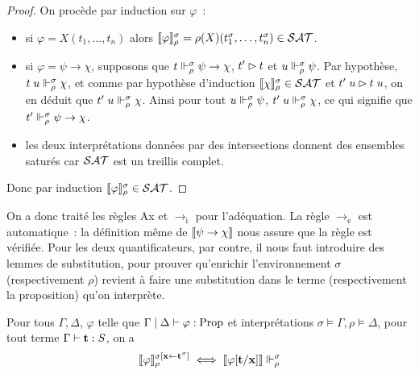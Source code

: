 \documentclass{article}
\begin{document}
\begin{proof}
  On procède par induction sur $\varphi$~:
  \begin{itemize}
  \item si $\varphi = X(t_1,\ldots,t_n)$ alors $\llbracket \varphi \rrbracket_\rho^\sigma=\rho(X)(t_1^\sigma,\ldots,t_n^\sigma)\in \mathcal {SAT}$.
  \item si $\varphi = \psi \to \chi$, supposons que $t\Vdash_\rho^\sigma \psi \to \chi$, $t'\rhd t$ et $u\Vdash_\rho^\sigma\psi$. Par hypothèse, $t\;u\Vdash_\rho^\sigma \chi$, et comme par hypothèse d'induction $\llbracket \chi \rrbracket_\rho^\sigma\in\mathcal {SAT}$ et $t'\;u\rhd t\;u$, on en déduit que $t'\;u\Vdash_\rho^\sigma \chi$. Ainsi pour tout $u\Vdash_\rho^\sigma\psi$, $t'\;u\Vdash_\rho^\sigma\chi$, ce qui signifie que $t'\Vdash_\rho^\sigma\psi\to\chi$.
  \item les deux interprétations données par des intersections donnent des ensembles saturés car $\mathcal {SAT}$ est un treillis complet.
  \end{itemize}
  Donc par induction $\llbracket \varphi \rrbracket_\rho^\sigma\in\mathcal {SAT}$.
\end{proof}

On a donc traité les règles Ax et $\to_\mathrm i$ pour l'adéquation. La règle $\to_\mathrm e$ est automatique~: la définition même de $\llbracket \psi\to\chi \rrbracket$ nous assure que la règle est vérifiée. Pour les deux quantificateurs, par contre, il nous faut introduire des lemmes de substitution, pour prouver qu'enrichir l'environnement $\sigma$ (respectivement $\rho$) revient à faire une substitution dans le terme (respectivement la proposition) qu'on interprète.

\begin{lem}\label{lem.subst.1}
  Pour tous $\Gamma,\Delta$, $\varphi$ telle que $\Gamma\mid\Delta\vdash \varphi : \mathrm{Prop}$ et interprétations $\sigma\models \Gamma, \rho \models \Delta$, pour tout terme $\Gamma\vdash \mathbf{t} : S$, on a
  \[\llbracket \varphi \rrbracket_\rho^{\sigma[\mathbf{x} \leftarrow \mathbf{t}^\sigma]}\iff \llbracket \varphi[\mathbf{t}/\mathbf{x}] \rrbracket\Vdash_\rho^\sigma\]
\end{lem}
\end{document}
